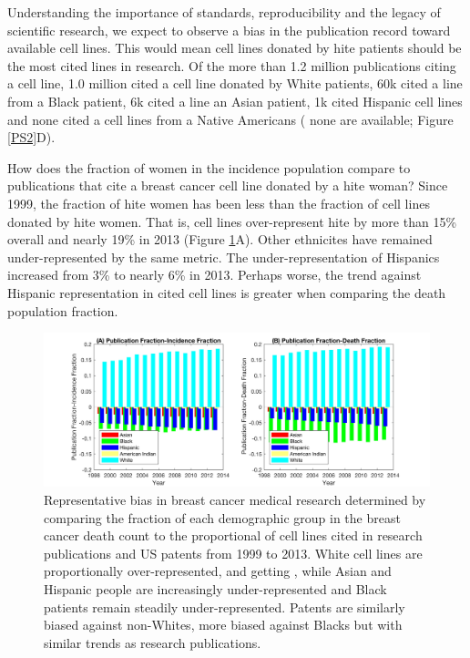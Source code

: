 \documentclass[11pt]{article}
\begin{document}
Understanding the importance of standards, reproducibility and the legacy of scientific research, we expect to observe a bias in the publication record toward available cell lines. This would mean cell lines donated by hite patients should be the most cited lines in research. Of the more than 1.2 million publications citing a cell line, 1.0 million cited a cell line donated by White patients, 60k cited a line from a Black patient, 6k cited a line an Asian patient, 1k cited Hispanic cell lines and none cited a cell lines from a Native Americans ( none are available; Figure \ref{PS2}D).

How does the fraction of women in the incidence population compare to publications that cite a breast cancer cell line donated by a hite woman? Since 1999, the fraction of hite women has been less than the fraction of cell lines donated by hite women. That is, cell lines over-represent hite  by more than 15\% overall and nearly 19\% in 2013 (Figure \ref{Bias}A). Other ethnicites have remained under-represented by the same metric. The under-representation of Hispanics increased from 3\% to nearly 6\% in 2013. Perhaps worse, the trend against Hispanic representation in cited cell lines is greater when comparing the death population fraction.

\begin{figure}[h!]
\centering
\includegraphics[width=1\columnwidth, trim = {10cm 0cm 10cm 0cm}, clip]{Figures/Bias.jpg}
\caption{\label{Bias} Representative bias in breast cancer medical research determined by comparing the fraction of each demographic group in the breast cancer death count to the proportional of cell lines cited in research publications and US patents from 1999 to 2013. White cell lines are proportionally over-represented, and getting , while Asian and Hispanic people are increasingly under-represented and Black patients remain steadily under-represented. Patents are similarly biased against non-Whites, more biased against Blacks\added[id=I]{,} but with similar trends as research publications.}
\end{figure}
\end{document}
